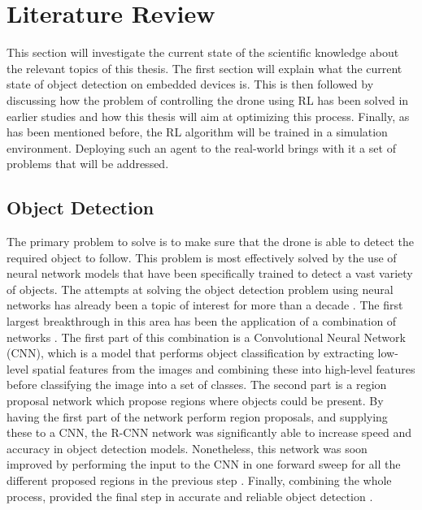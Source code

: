 \section{Literature Review}
This section will investigate the current state of the scientific knowledge 
about the relevant topics of this thesis. The first section will explain 
what the current state of object detection on embedded devices is.
This is then followed by discussing how the problem 
of controlling the drone using RL has been solved in earlier studies and how 
this thesis will aim at optimizing this process. Finally, 
as has been mentioned before, the RL algorithm will be trained in a simulation 
environment. Deploying such an agent to the real-world brings with it a set of 
problems that will be addressed.

\subsection{Object Detection}
The primary problem to solve is to make sure 
that the drone is able to detect the required object to follow. This problem is 
most effectively solved by the use of neural network models that have been specifically 
trained to detect a vast variety of objects. The attempts at solving the object 
detection problem using neural networks has already been a topic of interest for 
more than a decade \cite{original-rcnn}. The first largest breakthrough in this area 
has been the application of a combination of networks \cite{original-rcnn}. 
The first part of this combination is a Convolutional Neural Network (CNN), which is a model that 
performs object classification by extracting low-level 
spatial features from the images and combining these into high-level features before 
classifying the image into a set of classes. The second part is a region proposal 
network which propose regions 
where objects could be present. By having the first part of the network perform region proposals, 
and supplying these to a CNN, the R-CNN network was significantly able to increase speed and
accuracy in object detection models. Nonetheless, this network was soon improved by performing the 
input to the CNN in one forward sweep for all the different proposed regions in the 
previous step \cite{fastrcnn}. Finally, combining the whole process, provided the final 
step in accurate and reliable object detection \cite{fasterrcnn}. 

